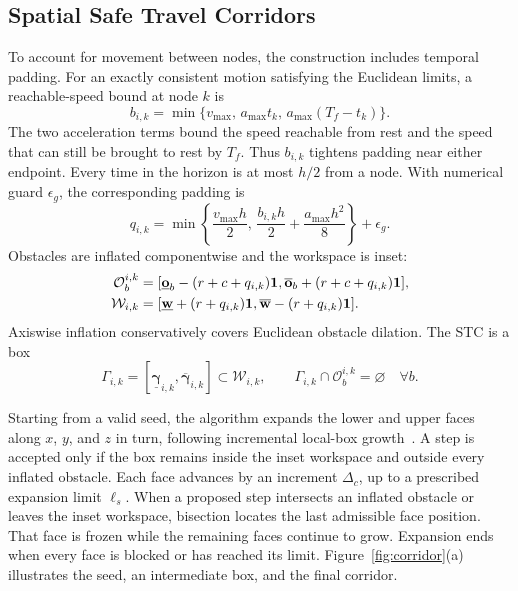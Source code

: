 \subsection{Spatial Safe Travel Corridors}
To account for movement between nodes, the construction includes temporal padding. For an exactly consistent motion satisfying the Euclidean limits, a reachable-speed bound at node $k$ is
\begin{equation}
 b_{i,k}=\min\{v_{\max},\,a_{\max}t_k,\,a_{\max}(T_f-t_k)\}.
 \label{eq:rate}
\end{equation}
The two acceleration terms bound the speed reachable from rest and the speed that can still be brought to rest by $T_f$. Thus $b_{i,k}$ tightens padding near either endpoint. Every time in the horizon is at most $h/2$ from a node. With numerical guard $\epsilon_g$, the corresponding padding is
\begin{equation}
 q_{i,k}=\min\left\{\frac{v_{\max}h}{2},\,
 \frac{b_{i,k}h}{2}+\frac{a_{\max}h^2}{8}\right\}+\epsilon_g.
 \label{eq:padding}
\end{equation}
Obstacles are inflated componentwise and the workspace is inset:
\begin{subequations}\label{eq:inflation}\begin{align}
 \mathcal O_b^{i,k}&=[\underline{\mathbf o}_b-(r+c+q_{i,k})\mathbf{1},
 \overline{\mathbf o}_b+(r+c+q_{i,k})\mathbf{1}],\\
 \mathcal W_{i,k}&=[\underline{\mathbf w}+(r+q_{i,k})\mathbf{1},
 \overline{\mathbf w}-(r+q_{i,k})\mathbf{1}].
\end{align}\end{subequations}
Axiswise inflation conservatively covers Euclidean obstacle dilation. The STC is a box
\begin{equation}
 \Gamma_{i,k}=[\underline{\boldsymbol\gamma}_{i,k},\overline{\boldsymbol\gamma}_{i,k}]
 \subset\mathcal W_{i,k},\qquad
 \Gamma_{i,k}\cap\mathcal O_b^{i,k}=\varnothing\quad\forall b.
 \label{eq:stc}
\end{equation}

Starting from a valid seed, the algorithm expands the lower and upper faces along $x$, $y$, and $z$ in turn, following incremental local-box growth~\cite{li2022liom}. A step is accepted only if the box remains inside the inset workspace and outside every inflated obstacle. Each face advances by an increment $\Delta_c$, up to a prescribed expansion limit $\ell_s$. When a proposed step intersects an inflated obstacle or leaves the inset workspace, bisection locates the last admissible face position. That face is frozen while the remaining faces continue to grow. Expansion ends when every face is blocked or has reached its limit. Figure~\ref{fig:corridor}(a) illustrates the seed, an intermediate box, and the final corridor.

